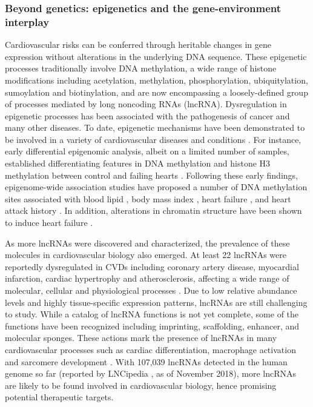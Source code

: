 \documentclass[letter]{bioinfo}
\begin{document}
\subsubsection*{Beyond genetics: epigenetics and the gene-environment interplay}	
	Cardiovascular risks can be conferred through heritable changes in gene expression without alterations in the underlying DNA sequence.  These epigenetic processes traditionally involve DNA methylation, a wide range of histone modifications including acetylation, methylation, phosphorylation, ubiquitylation, sumoylation and biotinylation, and are now encompassing a loosely-defined group of processes mediated by long noncoding RNAs (lncRNA). Dysregulation in epigenetic processes has been associated with the pathogenesis of cancer and many other diseases. To date, epigenetic mechanisms have been demonstrated to be involved in a variety of cardiovascular diseases and conditions \citep{Udali:2013:Cardiovascular,AbiKhalil:2014:emerging,Muka:2016:role,Gidlof:2016:Ischemic}.
	For instance, early differential epigenomic analysis, albeit on a limited number of samples, established differentiating features in DNA methylation and histone H3 methylation between control and failing hearts \citep{Movassagh:2011:Distinct}. Following these early findings, epigenome-wide association studies have proposed a number of DNA methylation sites associated with blood lipid \citep{Irvin:2014:Epigenomewide}, body mass index \citep{Dick:2014:DNA, Wahl:2017:Epigenomewide}, heart failure \citep{Meder:2017:EpigenomeWide}, and heart attack history \citep{Rask-Andersen:2016:Epigenomewide}. In addition, alterations in chromatin structure have been shown to induce heart failure \citep{Rosa-Garrido:2017:HighResolution}.  
	
	As more lncRNAs were discovered and characterized, the prevalence of these molecules in cardiovascular biology also emerged.
	At least 22 lncRNAs were reportedly dysregulated in CVDs including coronary artery disease, myocardial infarction, cardiac hypertrophy and atherosclerosis, affecting a wide range of molecular, cellular and physiological processes \citep{Das:2018:Deciphering, Xu:2018:Targeting}. Due to low relative abundance levels and highly tissue-specific expression patterns, lncRNAs are still challenging to study.
	While a catalog of lncRNA functions is not yet complete, some of the functions have been recognized including imprinting, scaffolding, enhancer, and molecular sponges. These actions mark the presence of lncRNAs in many cardiovascular processes such as cardiac differentiation, macrophage activation and sarcomere development \citep{Sallam:2018:Long}.
	With 107,039 lncRNAs detected in the human genome so far (reported by LNCipedia \citep{Volders:2018:LNCipedia}, as of November 2018), more lncRNAs are likely to be found involved in cardiovascular biology, hence promising potential therapeutic targets.
\end{document}
